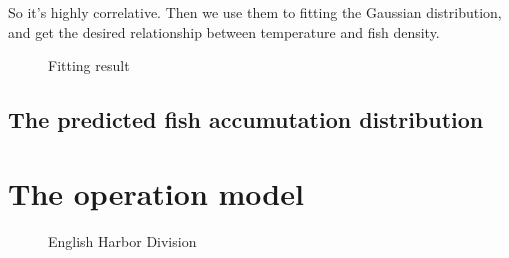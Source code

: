 \documentclass{mcmthesis}
\begin{document}
  So it's highly correlative. Then we use them to fitting the Gaussian distribution, and get the desired relationship between temperature and fish density.

  \begin{figure}[tbp]
    \caption{Fitting result}\label{figure1}
  \end{figure}

  \subsection{The predicted fish accumutation distribution}


\section{The operation model}
\begin{figure}[tbp]
  \caption{English Harbor Division}\label{figure1}
\end{figure}
\end{document}
